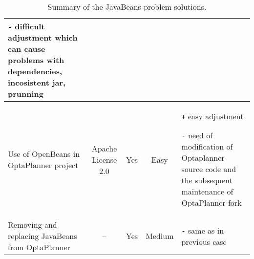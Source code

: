 \begin {table}[h!]
{\begin{tabular}{|l|c|c|c|p{5cm}|}
            \texttt{-} difficult adjustment which can cause problems with dependencies, incosistent jar, prunning
            \\ \hline

            \multicolumn{1}{|p{2.5cm}|}{Use of OpenBeans in OptaPlanner project} &
            \multicolumn{1}{p{2cm}|}{\centering Apache License 2.0} &
            Yes &
            Easy &
            \texttt{+} easy adjustment

            \texttt{-} need of modification of Optaplanner source code and the subsequent maintenance of
            OptaPlanner fork \\ \hline

            \multicolumn{1}{|p{2.5cm}|}{Removing and replacing JavaBeans from OptaPlanner} &
            -- &
            Yes &
            Medium &
            \texttt{-} same as in previous case\\ \hline
        \end{tabular}
    }
    \centering
    \caption{Summary of the JavaBeans problem solutions.}
    \label{SummaryJavaBeansTable}
\end{table}
